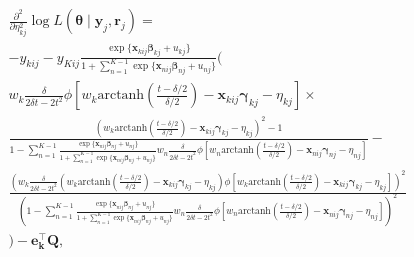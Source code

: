 \documentclass[12pt, %
               openright, %
               oneside, %
               a4paper, %
               chapter=TITLE, %
               section=TITLE, %
               brazil,
               english %
]{abntex2}
\begin{document}
\begin{apendicesenv}
\begin{align*}
  &\frac{\partial^{2}}{\partial \eta_{kj}^{2}}
    \log L(\bm{\theta}\mid\bm{y}_{j}, \bm{r}_{j}) =\\
  &- y_{kij} - y_{Kij}
    \frac{\exp\{\bm{x}_{kij} \bm{\beta}_{kj} + u_{kj}\}}{1 +
    \sum_{n = 1}^{K-1}\exp\{\bm{x}_{nij} \bm{\beta}_{nj} + u_{nj}\}}\Bigg(\\
  &w_{k}\frac{\delta}{2\delta t - 2t^{2}}
    \phi[w_{k}\text{arctanh}\left(\frac{t-\delta/2}{\delta/2}\right)
    - \bm{x}_{kij}\bm{\gamma}_{kj} - \eta_{kj}]\times\\
  &\frac{\left(
    w_{k} \text{arctanh}\left(\frac{t-\delta/2}{\delta/2}\right)
    - \bm{x}_{kij}\bm{\gamma}_{kj} - \eta_{kj}
    \right)^{2} - 1}{
    1 - \sum_{n = 1}^{K-1}
    \frac{\exp\{\bm{x}_{nij}\bm{\beta}_{nj} + u_{nj}\}}{1 +
    \sum_{n = 1}^{K-1}\exp\{\bm{x}_{nij} \bm{\beta}_{nj} + u_{nj}\}}
    w_{n}\frac{\delta}{2\delta t - 2t^{2}}
    \phi[w_{n}\text{arctanh}\left(\frac{t-\delta/2}{\delta/2}\right)
    - \bm{x}_{nij}\bm{\gamma}_{nj} - \eta_{nj}]} -\\
  &\frac{\left(
    w_{k}\frac{\delta}{2\delta t - 2t^{2}}
    (w_{k}\text{arctanh}\left(\frac{t-\delta/2}{\delta/2}\right)
    - \bm{x}_{kij}\bm{\gamma}_{kj} - \eta_{kj})
    \phi[w_{k}\text{arctanh}\left(\frac{t-\delta/2}{\delta/2}\right)
    - \bm{x}_{kij}\bm{\gamma}_{kj} - \eta_{kj}]\right)^{2}}{\left(1 -
    \sum_{n = 1}^{K-1}
    \frac{\exp\{\bm{x}_{nij} \bm{\beta}_{nj} + u_{nj}\}}{1 +
    \sum_{n = 1}^{K-1}\exp\{\bm{x}_{nij} \bm{\beta}_{nj} + u_{nj}\}}
    w_{n}\frac{\delta}{2\delta t - 2t^{2}}
    \phi[w_{n}\text{arctanh}\left(\frac{t-\delta/2}{\delta/2}\right)
    - \bm{x}_{nij}\bm{\gamma}_{nj} - \eta_{nj}]\right)^{2}}\\
  &\Bigg) - \bm{e_{k}^{\top}Q},
\end{align*}


\end{apendicesenv}
\end{document}
